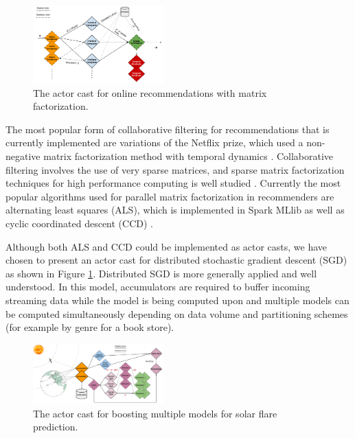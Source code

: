 \documentclass[draftclsnofoot,onecolumn,conference,11pt]{IEEEtran}
\begin{document}
\begin{figure}[!h]
    \centering
    \includegraphics[width=0.45\textwidth]{nnmf_cast}
    \caption{The actor cast for online recommendations with matrix factorization.}
    \label{fig:nnmf_cast}
\end{figure}

The most popular form of collaborative filtering for recommendations that is currently implemented are variations of the Netflix prize, which used a non-negative matrix factorization method with temporal dynamics \cite{koren_collaborative_2010}. Collaborative filtering involves the use of very sparse matrices, and sparse matrix factorization techniques for high performance computing is well studied \cite{gupta_highly_1997}. Currently the most popular algorithms used for parallel matrix factorization in recommenders are alternating least squares (ALS), which is implemented in Spark MLlib as well as cyclic coordinated descent (CCD) \cite{yu_scalable_2012}.

Although both ALS and CCD could be implemented as actor casts, we have chosen to present an actor cast for distributed stochastic gradient descent (SGD) \cite{gemulla_large-scale_2011} as shown in Figure \ref{fig:nnmf_cast}. Distributed SGD is more generally applied and well understood. In this model, accumulators are required to buffer incoming streaming data while the model is being computed upon and multiple models can be computed simultaneously depending on data volume and partitioning schemes (for example by genre for a book store).

\begin{figure}[!t]
    \centering
    \includegraphics[width=0.45\textwidth]{solar_cast}
    \caption{The actor cast for boosting multiple models for solar flare prediction.}
    \label{fig:solar_cast}
\end{figure}
\end{document}
